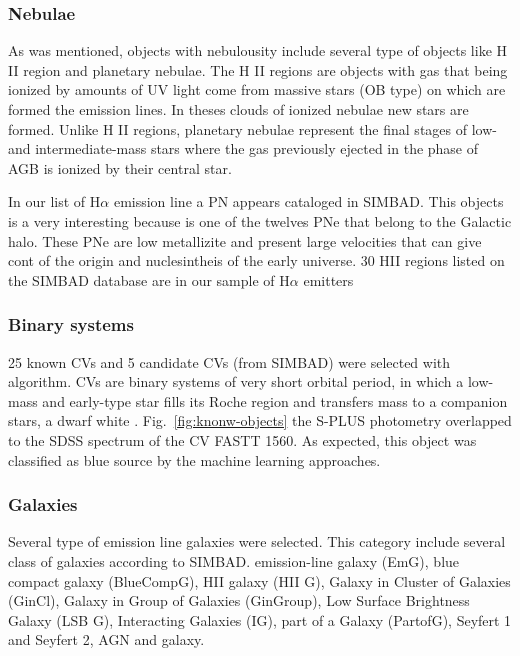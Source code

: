 \documentclass[fleqn,usenatbib]{mnras}
\begin{document}
{\subsubsection{Nebulae}

As was mentioned, objects with nebulousity include several
type of objects like H II region and  planetary nebulae.
The H II regions are objects with gas that being ionized by
amounts of UV light come from massive stars (OB type) on which
are formed the emission lines. In theses clouds of ionized nebulae
new stars are formed. Unlike H II regions, planetary nebulae
represent the final stages of low- and intermediate-mass stars
where the gas previously ejected in the phase of AGB is ionized
by their central star.

In our list of H{$\alpha$} emission line a PN appears cataloged in SIMBAD.
This objects is a very interesting because is one of the twelves PNe that belong
to the Galactic halo. These PNe are low metallizite and present large velocities that
can give cont of the origin and nuclesintheis of the early universe. 30 HII regions
listed on the SIMBAD database are in our sample of H{$\alpha$} emitters

\subsubsection{Binary systems}
25 known CVs and 5 candidate CVs (from SIMBAD) were selected with algorithm.
CVs are binary systems of very short orbital period, in which a low-mass and
early-type star fills its Roche region and transfers mass to a companion stars,
a dwarf white \citep{Patterson:1984}. Fig.~\ref{fig:knonw-objects} the S-PLUS
photometry overlapped to the SDSS spectrum of the CV FASTT 1560. As expected,
this object was classified as blue source by the machine learning approaches.

\subsubsection{Galaxies}
Several type of emission line galaxies were selected. This category include
several class of galaxies according to SIMBAD. emission-line galaxy (EmG),
blue compact galaxy (BlueCompG), HII galaxy (HII G), Galaxy in Cluster of Galaxies
(GinCl), Galaxy in Group of Galaxies (GinGroup), Low Surface Brightness Galaxy
(LSB G), Interacting Galaxies (IG), part of a Galaxy (PartofG), Seyfert 1 and
Seyfert 2, AGN and galaxy.


}
\end{document}
